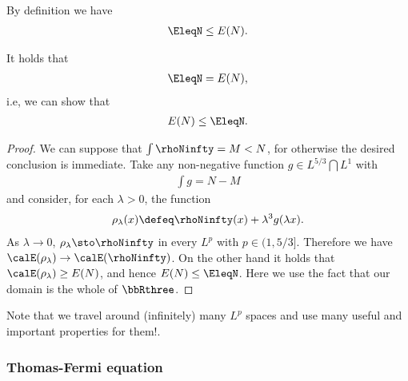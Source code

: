 \documentclass[openany, a4paper, oneside]{jsbook}
\begin{document}
By definition we have
\begin{align}
 \EleqN
 \leq
 E (N).
\end{align}
\begin{lem}
 It holds that
 \begin{align}
  \EleqN = E (N),
 \end{align}
 i.e, we can show that
 \begin{align}
  E (N) \leq \EleqN.
 \end{align}
\end{lem}
\begin{proof}
We can suppose that $\int \rhoNinfty = M < N$, for otherwise the desired conclusion is immediate.
Take any non-negative function $g \in L^{5/3} \bigcap L^{1}$ with
\begin{align}
 \int g = N - M
\end{align}
and consider, for each $\lambda > 0$, the function
\begin{align}
 \rho_{\lambda} (x)
 \defeq
 \rhoNinfty (x) + \lambda^3 g (\lambda x).
\end{align}
As $\lambda \to 0$, $\rho_{\lambda} \sto \rhoNinfty$ in every $L^p$ with $p \in (1, 5/3]$.
Therefore we have $\calE (\rho_{\lambda}) \to \calE (\rhoNinfty)$.
On the other hand it holds that $\calE (\rho_{\lambda}) \geq E (N)$,
and hence $E (N) \leq \EleqN$.
Here we use the fact that our domain is the whole of $\bbRthree$.
\end{proof}

Note that we travel around (infinitely) many $L^p$ spaces and use many useful and important properties for them!.
\subsubsection{Thomas-Fermi equation}
\end{document}
